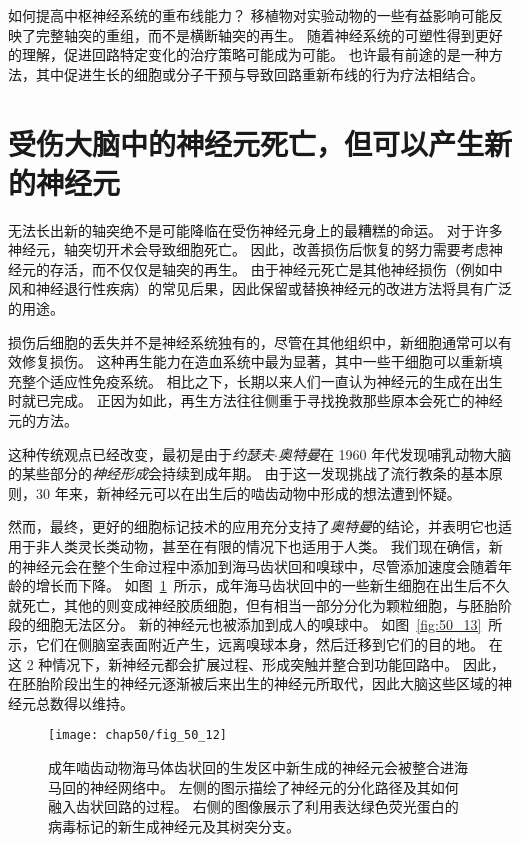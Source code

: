 如何提高中枢神经系统的重布线能力？
移植物对实验动物的一些有益影响可能反映了完整轴突的重组，而不是横断轴突的再生。
随着神经系统的可塑性得到更好的理解，促进回路特定变化的治疗策略可能成为可能。
也许最有前途的是一种方法，其中促进生长的细胞或分子干预与导致回路重新布线的行为疗法相结合。



\section{受伤大脑中的神经元死亡，但可以产生新的神经元}

无法长出新的轴突绝不是可能降临在受伤神经元身上的最糟糕的命运。
对于许多神经元，轴突切开术会导致细胞死亡。
因此，改善损伤后恢复的努力需要考虑神经元的存活，而不仅仅是轴突的再生。
由于神经元死亡是其他神经损伤（例如中风和神经退行性疾病）的常见后果，因此保留或替换神经元的改进方法将具有广泛的用途。


损伤后细胞的丢失并不是神经系统独有的，尽管在其他组织中，新细胞通常可以有效修复损伤。
这种再生能力在造血系统中最为显著，其中一些干细胞可以重新填充整个适应性免疫系统。
相比之下，长期以来人们一直认为神经元的生成在出生时就已完成。
正因为如此，再生方法往往侧重于寻找挽救那些原本会死亡的神经元的方法。


这种传统观点已经改变，最初是由于\textit{约瑟夫$\cdot$奥特曼}在 1960 年代发现哺乳动物大脑的某些部分的\textit{神经形成}会持续到成年期。
由于这一发现挑战了流行教条的基本原则，30 年来，新神经元可以在出生后的啮齿动物中形成的想法遭到怀疑。


然而，最终，更好的细胞标记技术的应用充分支持了\textit{奥特曼}的结论，并表明它也适用于非人类灵长类动物，甚至在有限的情况下也适用于人类。
我们现在确信，新的神经元会在整个生命过程中添加到海马齿状回和嗅球中，尽管添加速度会随着年龄的增长而下降。
如图~\ref{fig:50_12}~所示，成年海马齿状回中的一些新生细胞在出生后不久就死亡，其他的则变成神经胶质细胞，但有相当一部分分化为颗粒细胞，与胚胎阶段的细胞无法区分。
新的神经元也被添加到成人的嗅球中。
如图~\ref{fig:50_13}~所示，它们在侧脑室表面附近产生，远离嗅球本身，然后迁移到它们的目的地。
在这 2 种情况下，新神经元都会扩展过程、形成突触并整合到功能回路中。
因此，在胚胎阶段出生的神经元逐渐被后来出生的神经元所取代，因此大脑这些区域的神经元总数得以维持。



\begin{figure}[htbp]
	\centering
	\texttt{[image: chap50/fig\_50\_12]}
	\caption{成年啮齿动物海马体齿状回的生发区中新生成的神经元会被整合进海马回的神经网络中。
		左侧的图示描绘了神经元的分化路径及其如何融入齿状回路的过程。
		右侧的图像展示了利用表达绿色荧光蛋白的病毒标记的新生成神经元及其树突分支。}
	\label{fig:50_12}
\end{figure}


